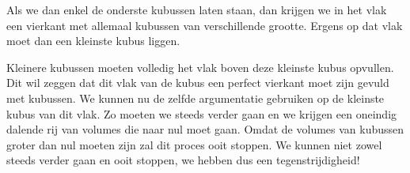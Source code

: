 
Als we dan enkel de onderste kubussen laten staan, dan krijgen we in het vlak een vierkant met allemaal kubussen van verschillende grootte. Ergens op dat vlak moet dan een kleinste kubus liggen.





Kleinere kubussen moeten volledig het vlak boven deze kleinste kubus opvullen. Dit wil zeggen dat dit vlak van de kubus een perfect vierkant moet zijn gevuld met kubussen. We kunnen nu de zelfde argumentatie gebruiken op de kleinste kubus van dit vlak. Zo moeten we steeds verder gaan en we krijgen een oneindig dalende rij van volumes die naar nul moet gaan. Omdat de volumes van kubussen groter dan nul moeten zijn zal dit proces ooit stoppen. We kunnen niet zowel steeds verder gaan en ooit stoppen, we hebben dus een tegenstrijdigheid!





